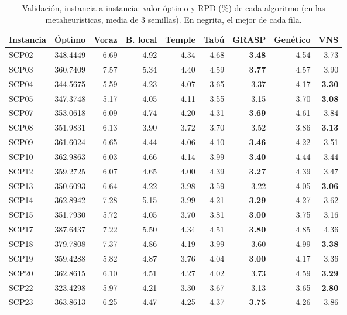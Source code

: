 \begin{table}[H]
\centering
\caption{Validación, instancia a instancia: valor óptimo y RPD (\%) de cada algoritmo (en las metaheurísticas, media de 3 semillas). En negrita, el mejor de cada fila.}
\label{tab:validacion-inst}
\small
\begin{tabular}{@{}lrrrrrrrr@{}}
\toprule
Instancia & Óptimo & Voraz & B. local & Temple & Tabú & GRASP & Genético & VNS \\ \midrule
SCP02 & 348.4449 & 6.69 & 4.92 & 4.34 & 4.68 & \textbf{3.48} & 4.54 & 3.73 \\
SCP03 & 360.7409 & 7.57 & 5.34 & 4.40 & 4.59 & \textbf{3.77} & 4.57 & 3.90 \\
SCP04 & 344.5675 & 5.59 & 4.23 & 4.07 & 3.65 & 3.37 & 4.17 & \textbf{3.30} \\
SCP05 & 347.3748 & 5.17 & 4.05 & 4.11 & 3.55 & 3.15 & 3.70 & \textbf{3.08} \\
SCP07 & 353.0618 & 6.09 & 4.74 & 4.20 & 4.31 & \textbf{3.69} & 4.61 & 3.84 \\
SCP08 & 351.9831 & 6.13 & 3.90 & 3.72 & 3.70 & 3.52 & 3.86 & \textbf{3.13} \\
SCP09 & 361.6024 & 6.65 & 4.44 & 4.06 & 4.10 & \textbf{3.46} & 4.22 & 3.51 \\
SCP10 & 362.9863 & 6.03 & 4.66 & 4.14 & 3.99 & \textbf{3.40} & 4.44 & 3.44 \\
SCP12 & 359.2725 & 6.07 & 4.65 & 4.00 & 4.39 & \textbf{3.27} & 4.39 & 3.47 \\
SCP13 & 350.6093 & 6.64 & 4.22 & 3.98 & 3.59 & 3.22 & 4.05 & \textbf{3.06} \\
SCP14 & 362.8942 & 7.28 & 5.15 & 3.99 & 4.21 & \textbf{3.29} & 4.27 & 3.62 \\
SCP15 & 351.7930 & 5.72 & 4.05 & 3.70 & 3.81 & \textbf{3.00} & 3.75 & 3.16 \\
SCP17 & 387.6437 & 7.22 & 5.50 & 4.34 & 4.51 & \textbf{3.80} & 4.85 & 4.36 \\
SCP18 & 379.7808 & 7.37 & 4.86 & 4.19 & 3.99 & 3.60 & 4.99 & \textbf{3.38} \\
SCP19 & 359.4288 & 5.82 & 4.87 & 3.76 & 4.04 & \textbf{3.00} & 4.17 & 3.36 \\
SCP20 & 362.8615 & 6.10 & 4.51 & 4.27 & 4.02 & 3.73 & 4.59 & \textbf{3.29} \\
SCP22 & 323.4298 & 5.97 & 4.21 & 3.30 & 3.67 & 3.13 & 3.65 & \textbf{2.80} \\
SCP23 & 363.8613 & 6.25 & 4.47 & 4.25 & 4.37 & \textbf{3.75} & 4.26 & 3.86 \\

\end{tabular}
\end{table}
